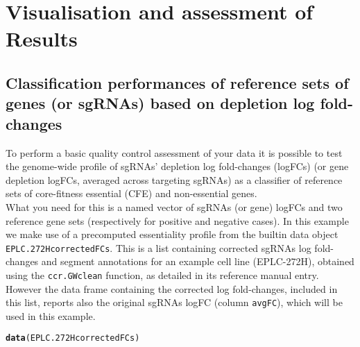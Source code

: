 \documentclass{article}\usepackage[]{graphicx}\usepackage[]{color}
\makeatletter
\newcommand{\hlstd}[1]{\textcolor[rgb]{0.345,0.345,0.345}{#1}}%
\newcommand{\hlkwd}[1]{\textcolor[rgb]{0.737,0.353,0.396}{\textbf{#1}}}%
\newenvironment{kframe}{%
 \def\at@end@of@kframe{}%
 \ifinner\ifhmode%
  \def\at@end@of@kframe{\end{minipage}}%
  \begin{minipage}{\columnwidth}%
 \fi\fi%
 \def\FrameCommand##1{\hskip\@totalleftmargin \hskip-\fboxsep
 \colorbox{shadecolor}{##1}\hskip-\fboxsep
     \hskip-\linewidth \hskip-\@totalleftmargin \hskip\columnwidth}%
 \MakeFramed {\advance\hsize-\width
   \@totalleftmargin\z@ \linewidth\hsize
   \@setminipage}}%
 {\par\unskip\endMakeFramed%
 \at@end@of@kframe}
\newenvironment{knitrout}{}{} %
\makeatother
\begin{document}
\section{Visualisation and assessment of Results}
 
\subsection{Classification performances of reference sets of genes (or sgRNAs) based on depletion log fold-changes}

To perform a basic quality control assessment of your data it is possible to test the genome-wide profile of sgRNAs' depletion log fold-changes (logFCs) (or gene depletion logFCs, averaged across targeting sgRNAs) as a classifier of reference sets of core-fitness essential (CFE) and non-essential genes.\\

What you need for this is a named vector of sgRNAs (or gene) logFCs and two reference gene sets (respectively for positive and negative cases). In this example we make use of a precomputed essentiality profile from the builtin data object \texttt{EPLC.272HcorrectedFCs}. This is a list containing corrected sgRNAs log fold-changes and segment annotations for an example cell line (EPLC-272H), obtained using the \texttt{ccr.GWclean} function, as detailed in its reference manual entry. However the data frame containing the corrected log fold-changes, included in this list, reports also the original sgRNAs logFC (column \texttt{avgFC}), which will be used in this example.
 
\begin{knitrout}
\color{fgcolor}\begin{kframe}
\begin{alltt}
\hlkwd{data}\hlstd{(EPLC.272HcorrectedFCs)}
\end{alltt}
\end{kframe}
\end{knitrout}
\end{document}
